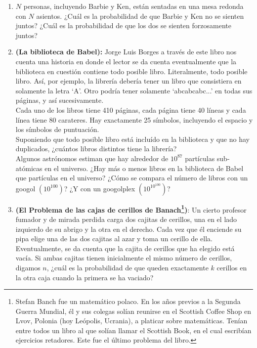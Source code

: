 \documentclass{article}
\begin{document}
\begin{enumerate}
            \item $N$ personas, incluyendo Barbie y Ken, están sentadas en una mesa redonda con $N$ asientos. 
    ¿Cuál es la probabilidad de que Barbie y Ken no se sienten juntos? ¿Cuál es la probabilidad de que los dos 
    se sienten forzosamente juntos?
    \item \textbf{(La biblioteca de Babel):} Jorge Luis Borges a través de este libro nos cuenta una historia en donde 
    el lector se da cuenta eventualmente que la biblioteca en cuestión contiene todo posible libro. Literalmente, todo posible libro. 
    Así, por ejemplo, la librería debería tener un libro que consistiera en solamente la letra `A'. Otro podría 
    tener solamente `abcabcabc...' en todas sus páginas, y así sucesivamente.\\

    Cada uno de los libros tiene 410 páginas, cada página tiene 40 líneas y cada línea tiene 80 carateres. 
    Hay exactamente 25 símbolos, incluyendo el espacio y los símbolos de puntuación. \\

    Suponiendo que todo posible libro está incluído en la biblioteca y que no hay duplicados, ¿cuántos libros 
    distintos tiene la librería?\\

    Algunos astrónomos estiman que hay alrededor de $10^{87}$ partículas sub-atómicas en el universo.
    ¿Hay más o menos libros en la biblioteca de Babel que partículas en el universo? ¿Cómo se compara el número 
    de libros con un googol $\left(10^{100}\right)$? ¿Y con un googolplex $\left(10^{10^{100}}\right)$?

    \item \textbf{(El Problema de las cajas de cerillos de Banach\footnote[1]{Stefan Banch fue un matemático polaco. En los años previos a la Segunda 
    Guerra Mundial, él y sus colegas solían reunirse en el Scottish Coffee Shop en Lvov, Polonia (hoy Leópolis, Ucrania), a platicar sobre matemáticas.
    Tenían entre todos un libro al que solían llamar el Scottish Book, en el cual escribían ejercicios retadores. Este fue el último 
    problema del libro.})}: Un cierto profesor fumador y de mirada perdida 
    carga dos cajitas de cerillos, una en el lado izquierdo de su abrigo y la otra en el derecho. Cada vez 
    que él enciende su pipa elige una de las dos cajitas al azar y toma un cerillo de ella. Eventualmente, se 
    da cuenta que la cajita de cerillos que ha elegido está vacía. Si ambas cajitas tienen inicialmente el mismo número 
    de cerillos, digamos $n$, ¿cuál es la probabilidad de que queden exactamente $k$ cerillos en la otra caja 
    cuando la primera se ha vaciado?
   

\end{enumerate}
\end{document}
